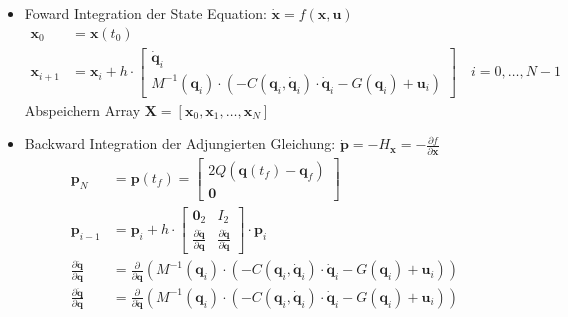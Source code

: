 \documentclass[a4paper, 12pt]{scrartcl}
\begin{document}
\begin{itemize}
    \item[1)] Foward Integration der State Equation: $\dot{\bm{x}}=f(\bm{x},\bm{u})$
    \begin{align*}
        \bm{x}_0 &= \bm{x}(t_0) \\
        \bm{x}_{i+1} 
        &=
        \bm{x}_i + h \cdot
        \begin{bmatrix}
            \dot{\bm{q}}_i \\
            M^{-1}(\bm{q}_i) \cdot ( - C(\bm{q}_i,\dot{\bm{q}}_i) \cdot \dot{\bm{q}}_i - G(\bm{q}_i) + \bm{u}_i )
        \end{bmatrix}
        \quad i = 0, \ldots, N-1
    \end{align*}
    Abspeichern Array $\bm{X} = [\bm{x}_0, \bm{x}_1, \ldots, \bm{x}_N]$
    \item[2)] Backward Integration der Adjungierten Gleichung: 
    $\dot{\bm{p}} = - H_{\bm{x}} = - \frac{\partial f}{\partial \bm{x}}$
    \begin{align*}
        \bm{p}_N 
        &= \bm{p}(t_f) 
        = 
        \begin{bmatrix}
            2 Q (\bm{q}(t_f) - \bm{q}_f) \\
            \bm{0}
        \end{bmatrix} \\
        \bm{p}_{i-1} 
        &= \bm{p}_{i} + h  \cdot
        \begin{bmatrix}
           \bm{0}_2 & I_2 \\
            \frac{\partial \ddot{\bm{q}}}{\partial \bm{q}}
           &
           \frac{\partial \ddot{\bm{q}}}{\partial \dot{\bm{q}}}
        \end{bmatrix}
        \cdot \bm{p}_{i} \\
        \frac{\partial \ddot{\bm{q}}}{\partial \bm{q}} 
        &=
        \frac{\partial}{\partial \bm{q}} 
        \left( 
            M^{-1}(\bm{q}_i) \cdot ( - C(\bm{q}_i,\dot{\bm{q}}_i) \cdot \dot{\bm{q}}_i 
            - G(\bm{q}_i) + \bm{u}_i ) 
            \right) 
            \\
        \frac{\partial \ddot{\bm{q}}}{\partial \bm{q}} &= 
        \frac{\partial}{\partial \dot{\bm{q}}} \left( 
            M^{-1}(\bm{q}_i) \cdot ( - C(\bm{q}_i,\dot{\bm{q}}_i) 
            \cdot \dot{\bm{q}}_i - G(\bm{q}_i) + \bm{u}_i ) 
            \right)
    \end{align*}
    \begin{itemize}

\end{itemize}
\end{itemize}
\end{document}
